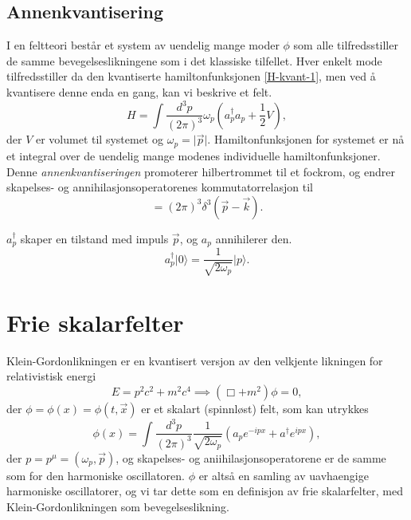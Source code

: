 \documentclass{article}
\newcommand{\KG}{\Box + m^2}
\newcommand{\ket}[1]{\mathopen| {#1} \rangle}
\newcommand{\abs}[1]{\mathopen| {#1} \mathclose|}
\begin{document}
\subsection{Annenkvantisering}
I en feltteori består et system av uendelig mange moder $\phi$ som alle tilfredsstiller de samme bevegelseslikningene som i det klassiske tilfellet.
Hver enkelt mode tilfredsstiller da den kvantiserte hamiltonfunksjonen \eqref{H-kvant-1}, men ved å kvantisere denne enda en gang, kan vi beskrive et felt.
\begin{equation*}
    H = \int \frac{d^3p}{(2\pi)^3} \omega_p \left(a_p^\dagger a_p + \frac{1}{2} V \right),
    \label{H-kvant-2}
\end{equation*}
der $V$ er volumet til systemet og $\omega_p = \abs{\vec{p}}$.
Hamiltonfunksjonen for systemet er nå et integral over de uendelig mange modenes individuelle hamiltonfunksjoner.
Denne \emph{annenkvantiseringen} promoterer hilbertrommet til et fockrom, og endrer skapelses- og annihilasjonsoperatorenes kommutatorrelasjon til
\begin{equation*}
    [\hat{a_p}, \hat{a^\dagger_k}] = (2\pi)^3 \delta^3(\vec{p} - \vec{k}).
\end{equation*}

$a^\dagger_p$ skaper en tilstand med impuls $\vec{p}$, og $a_p$ annihilerer den.
\begin{equation*}
    a^\dagger_p \ket{0} = \frac{1}{\sqrt{2\omega_p}}\ket{p}. 
\end{equation*}

\section{Frie skalarfelter}
Klein-Gordonlikningen er en kvantisert versjon av den velkjente likningen for relativistisk energi
\begin{equation*}
    E = p^2c^2 + m^2c^4 \implies (\KG) \phi = 0,
\end{equation*}
der $\phi = \phi(x) = \phi(t, \vec{x})$ er et skalart (spinnløst) felt, som kan utrykkes
\begin{equation*}
    \phi(x) = 
        \int \frac{d^3p}{(2\pi)^3} \frac{1}{\sqrt{2\omega_p}} (a_p e^{-ipx} + a^\dagger e^{ipx}),
\end{equation*}
der $p = p^\mu = (\omega_p, \vec{p})$, og skapelses- og aniihilasjonsoperatorene er de samme som for den harmoniske oscillatoren.
$\phi$ er altså en samling av uavhaengige harmoniske oscillatorer, og vi tar dette som en definisjon av frie skalarfelter, med Klein-Gordonlikningen som bevegelseslikning.
\end{document}
